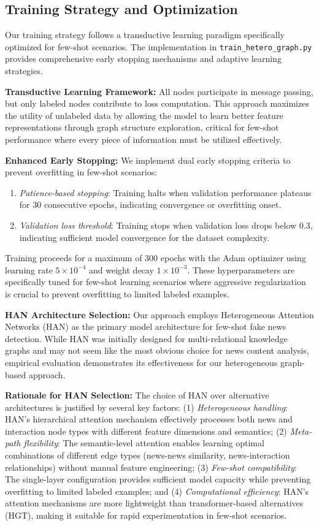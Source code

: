 \subsection{Training Strategy and Optimization}

Our training strategy follows a transductive learning paradigm specifically optimized for few-shot scenarios. The implementation in \texttt{train\_hetero\_graph.py} provides comprehensive early stopping mechanisms and adaptive learning strategies.

\textbf{Transductive Learning Framework:} All nodes participate in message passing, but only labeled nodes contribute to loss computation. This approach maximizes the utility of unlabeled data by allowing the model to learn better feature representations through graph structure exploration, critical for few-shot performance where every piece of information must be utilized effectively.

\textbf{Enhanced Early Stopping:} We implement dual early stopping criteria to prevent overfitting in few-shot scenarios:
\begin{enumerate}
\item \emph{Patience-based stopping}: Training halts when validation performance plateaus for 30 consecutive epochs, indicating convergence or overfitting onset.
\item \emph{Validation loss threshold}: Training stops when validation loss drops below 0.3, indicating sufficient model convergence for the dataset complexity.
\end{enumerate}

Training proceeds for a maximum of 300 epochs with the Adam optimizer using learning rate $5 \times 10^{-4}$ and weight decay $1 \times 10^{-3}$. These hyperparameters are specifically tuned for few-shot learning scenarios where aggressive regularization is crucial to prevent overfitting to limited labeled examples.

\textbf{HAN Architecture Selection:} Our approach employs Heterogeneous Attention Networks (HAN) as the primary model architecture for few-shot fake news detection. While HAN was initially designed for multi-relational knowledge graphs and may not seem like the most obvious choice for news content analysis, empirical evaluation demonstrates its effectiveness for our heterogeneous graph-based approach.

\textbf{Rationale for HAN Selection:} The choice of HAN over alternative architectures is justified by several key factors: (1) \emph{Heterogeneous handling}: HAN's hierarchical attention mechanism effectively processes both news and interaction node types with different feature dimensions and semantics; (2) \emph{Meta-path flexibility}: The semantic-level attention enables learning optimal combinations of different edge types (news-news similarity, news-interaction relationships) without manual feature engineering; (3) \emph{Few-shot compatibility}: The single-layer configuration provides sufficient model capacity while preventing overfitting to limited labeled examples; and (4) \emph{Computational efficiency}: HAN's attention mechanisms are more lightweight than transformer-based alternatives (HGT), making it suitable for rapid experimentation in few-shot scenarios.

\EndChapter
